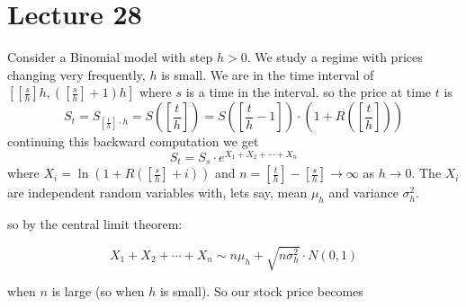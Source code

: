 \documentclass[oneside]{book}
\begin{document}
    \section{Lecture 28}

    Consider a Binomial model with step $h>0$. We study a regime with prices changing very frequently, $h$ is
    small. We are in the time interval of $[[\frac{s}{h}]h, ([\frac{s}{h}]+1)h]$ where $s$ is a time in the interval.
    so the price at time $t$ is
    $$
    S_t = S_{\left[\frac{t}{h}\right]\cdot h} = S\left(\left[\frac{t}{h}\right]\right) =
    S\left(\left[\frac{t}{h} - 1\right]\right) \cdot \left(1 + R\left(\left[\frac{t}{h}\right]\right)\right)
    $$
    continuing this backward computation we get
    $$
    S_t = S_s\cdot e^{X_1 + X_2 + \cdots + X_n}
    $$
    where $X_i = \ln\left(1 + R\left(\left[\frac{s}{h}\right] + i\right)\right)$ and $n = \left[\frac{t}{h}\right] - \left[\frac{s}{h}\right] \rightarrow \infty$
    as $h \rightarrow 0$. The $X_i$ are independent random variables with, lets say, mean $\mu_h$ and variance $\sigma_h^2$.

    so by the central limit theorem:

    $$
    X_1 + X_2 + \cdots + X_n \sim n\mu_h + \sqrt{n\sigma_h^2}\cdot N(0,1)
    $$

    when $n$ is large (so when $h$ is small). So our stock price becomes
\end{document}
